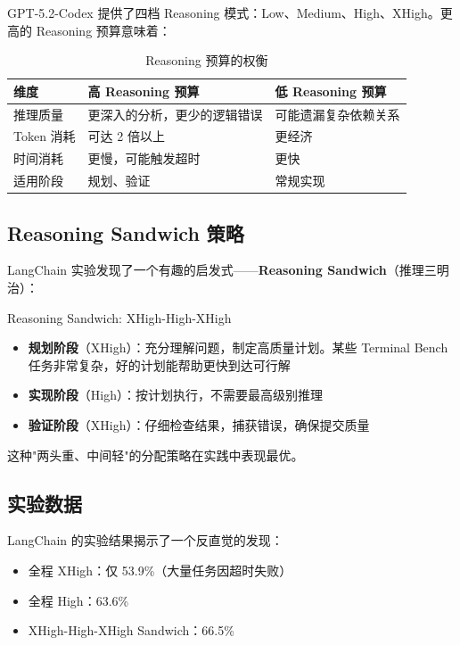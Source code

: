 \documentclass[a4paper]{article}
\begin{document}
GPT-5.2-Codex 提供了四档 Reasoning 模式：Low、Medium、High、XHigh。更高的 Reasoning 预算意味着：

\begin{table}[H]
\centering
\caption{Reasoning 预算的权衡}
\begin{tabular}{p{3cm}p{5cm}p{5cm}}
\toprule
\textbf{维度} & \textbf{高 Reasoning 预算} & \textbf{低 Reasoning 预算} \\
\midrule
推理质量 & 更深入的分析，更少的逻辑错误 & 可能遗漏复杂依赖关系 \\
Token 消耗 & 可达 2 倍以上 & 更经济 \\
时间消耗 & 更慢，可能触发超时 & 更快 \\
适用阶段 & 规划、验证 & 常规实现 \\
\bottomrule
\end{tabular}
\end{table}

\subsection{Reasoning Sandwich 策略}

LangChain 实验发现了一个有趣的启发式——\textbf{Reasoning Sandwich}（推理三明治）：

\begin{importantbox}{Reasoning Sandwich: XHigh-High-XHigh}
\begin{itemize}[leftmargin=1.5em]
    \item \textbf{规划阶段}（XHigh）：充分理解问题，制定高质量计划。某些 Terminal Bench 任务非常复杂，好的计划能帮助更快到达可行解
    \item \textbf{实现阶段}（High）：按计划执行，不需要最高级别推理
    \item \textbf{验证阶段}（XHigh）：仔细检查结果，捕获错误，确保提交质量
\end{itemize}
这种"两头重、中间轻"的分配策略在实践中表现最优。
\end{importantbox}

\subsection{实验数据}

LangChain 的实验结果揭示了一个反直觉的发现：

\begin{itemize}[leftmargin=1.5em]
    \item 全程 XHigh：仅 53.9\%（大量任务因超时失败）
    \item 全程 High：63.6\%
    \item XHigh-High-XHigh Sandwich：66.5\%
\end{itemize}
\end{document}
